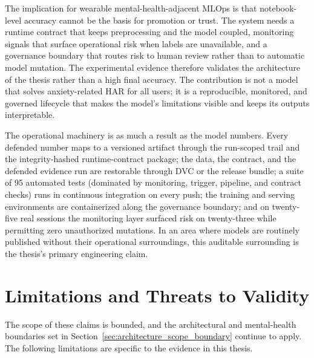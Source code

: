 The implication for wearable mental-health-adjacent MLOps is that notebook-level accuracy cannot be the basis for promotion or trust. The system needs a runtime contract that keeps preprocessing and the model coupled, monitoring signals that surface operational risk when labels are unavailable, and a governance boundary that routes risk to human review rather than to automatic model mutation. The experimental evidence therefore validates the architecture of the thesis rather than a high final accuracy. The contribution is not a model that solves anxiety-related HAR for all users; it is a reproducible, monitored, and governed lifecycle that makes the model's limitations visible and keeps its outputs interpretable.

The operational machinery is as much a result as the model numbers. Every defended number maps to a versioned artifact through the run-scoped trail and the integrity-hashed runtime-contract package; the data, the contract, and the defended evidence run are restorable through DVC or the release bundle; a suite of 95 automated tests (dominated by monitoring, trigger, pipeline, and contract checks) runs in continuous integration on every push; the training and serving environments are containerized along the governance boundary; and on twenty-five real sessions the monitoring layer surfaced risk on twenty-three while permitting zero unauthorized mutations. In an area where models are routinely published without their operational surroundings, this auditable surrounding is the thesis's primary engineering claim.

\section{Limitations and Threats to Validity}
\label{sec:ch8_limitations}

The scope of these claims is bounded, and the architectural and mental-health boundaries set in Section~\ref{sec:architecture_scope_boundary} continue to apply. The following limitations are specific to the evidence in this thesis.

